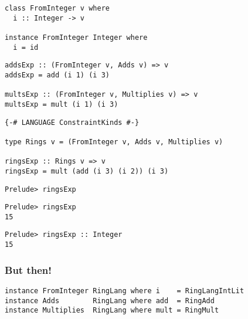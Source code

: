\documentclass[pdf]{beamer}
\begin{document}
\begin{frame}[fragile]
\begin{lstlisting}
class FromInteger v where
  i :: Integer -> v

instance FromInteger Integer where
  i = id
\end{lstlisting}
\end{frame}

\begin{frame}[fragile]
\begin{lstlisting}
addsExp :: (FromInteger v, Adds v) => v
addsExp = add (i 1) (i 3)

multsExp :: (FromInteger v, Multiplies v) => v
multsExp = mult (i 1) (i 3)
\end{lstlisting}
\end{frame}

\begin{frame}[fragile]
\begin{lstlisting}
{-# LANGUAGE ConstraintKinds #-}

type Rings v = (FromInteger v, Adds v, Multiplies v)

ringsExp :: Rings v => v
ringsExp = mult (add (i 3) (i 2)) (i 3)
\end{lstlisting}
\end{frame}

\begin{frame}[fragile]
\begin{lstlisting}
Prelude> ringsExp

\end{lstlisting}
\end{frame}

\begin{frame}[fragile]
\begin{lstlisting}
Prelude> ringsExp
15
\end{lstlisting}
\end{frame}

\begin{frame}[fragile]
\begin{lstlisting}
Prelude> ringsExp :: Integer
15
\end{lstlisting}
\end{frame}

\begin{frame}[fragile]
  \frametitle{But then!}
\begin{lstlisting}
instance FromInteger RingLang where i    = RingLangIntLit
instance Adds        RingLang where add  = RingAdd
instance Multiplies  RingLang where mult = RingMult
\end{lstlisting}
\end{frame}
\end{document}
